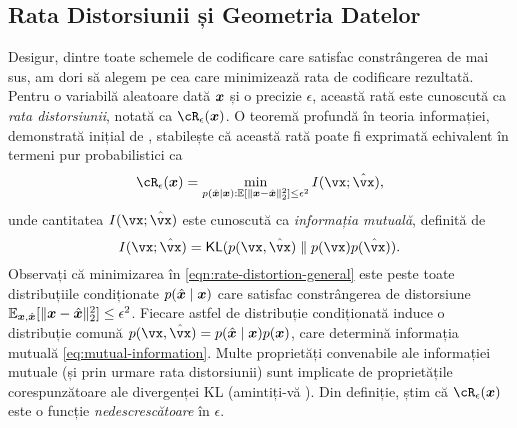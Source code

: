 \documentclass[../../book-main_ro.tex]{subfiles}
\begin{document}
\subsection{Rata Distorsiunii și Geometria Datelor}
Desigur, dintre toate schemele de codificare care satisfac constrângerea de mai sus, am dori să alegem pe cea care minimizează rata de codificare rezultată. Pentru o variabilă aleatoare dată $\bm{x}$ și o precizie $\epsilon$, această rată este cunoscută ca {\em rata distorsiunii}, notată ca $\cR_{\epsilon}(\x)$.
O teoremă profundă în teoria informației, demonstrată inițial de \textcite{shannon1959coding}, stabilește că această rată poate fi exprimată echivalent în termeni pur probabilistici ca
\begin{equation}
	\cR_{\epsilon}(\x) 
	= \min_{p(\hat \x \mid \x): \Ex[\norm{\x -\hat \x}_2^{2}] \le \epsilon^{2}} 
	I(\vx; \hat{\vx}),
    \label{eqn:rate-distortion-general}
\end{equation}
unde cantitatea $I(\vx; \hat{\vx})$ este cunoscută ca \textit{informația mutuală}, definită de
\begin{equation}\label{eq:mutual-information}
	I(\vx; \hat{\vx})
	= \KL(p(\vx, \hat{\vx}) \mmid p(\vx) p(\hat{\vx})).
\end{equation}
Observați că minimizarea în \eqref{eqn:rate-distortion-general} este peste toate distribuțiile condiționate $p(\hat {\bm{x}} \mid \bm{x})$ care satisfac constrângerea de distorsiune $\Ex_{\x, \hat \x}[\norm{\x- \hat \x}_2^{2}] \le \epsilon^{2}$.
Fiecare astfel de distribuție condiționată induce o distribuție comună $p(\vx, \hat{\vx}) = p(\hat\x \mid \x) p(\x)$, care determină informația mutuală \eqref{eq:mutual-information}.
Multe proprietăți convenabile ale informației mutuale (și prin urmare rata distorsiunii) sunt implicate de proprietățile corespunzătoare ale divergenței KL (amintiți-vă ).
Din definiție, știm că $\cR_{\epsilon}(\x)$ este o funcție {\em nedescrescătoare} în $\epsilon$.
\end{document}

